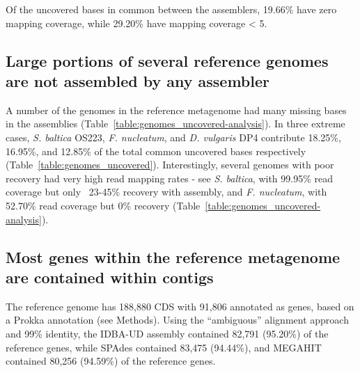 \documentclass[10pt,a4paper,twocolumn]{article}
\begin{document}

Of the uncovered bases in common between the assemblers, 19.66\% have
zero mapping coverage, while 29.20\% have mapping coverage \textless
5.


\subsection*{Large portions of several reference genomes are not assembled by any assembler}

A number of the genomes in the reference metagenome had many missing
bases in the assemblies (Table~\ref{table:genomes_uncovered-analysis}). In
three extreme cases, {\em S. baltica} OS223, {\em F.
nucleatum}, and {\em D. vulgaris} DP4 contribute 18.25\%, 16.95\%, and 12.85\%
of the total common uncovered bases respectively (Table~\ref{table:genomes_uncovered}).  Interestingly, several genomes with poor recovery had very high read mapping rates - see {\em S. baltica}, with 99.95\% read coverage but only ~23-45\% recovery with assembly, and {\em F. nucleatum}, with 52.70\% read coverage but 0\% recovery (Table~\ref{table:genomes_uncovered-analysis}).



\subsection*{Most genes within the reference metagenome are contained within contigs}

The reference genome has 188,880 CDS with 91,806 annotated as genes,
based on a Prokka annotation (see Methods).
Using the ``ambiguous'' alignment approach and 99\% identity, the
IDBA-UD assembly contained 82,791 (95.20\%) of the reference genes,
while SPAdes contained 83,475 (94.44\%), and
MEGAHIT contained 80,256 (94.59\%) of the reference genes.
\end{document}
